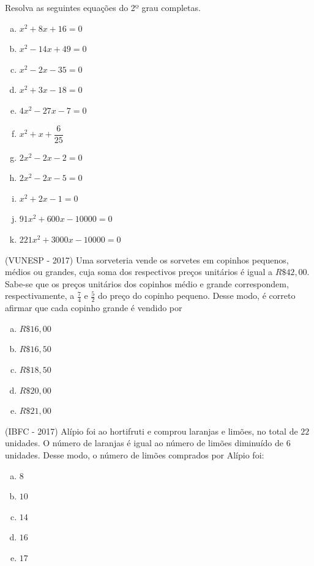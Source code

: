 \begin{exer}
Resolva as seguintes equações do 2º grau completas.
\begin{multicols}{2}
\begin{enumerate}[a)]
\item $x^2 + 8x + 16=0$
\item $x^2 - 14x + 49=0$
\item $x^2 - 2x - 35=0$
\item $x^2 + 3x - 18=0$
\item $4x^2 - 27x - 7=0$
\item $x^2 + x + \dfrac{6}{25}$
\item $2x^2 - 2x - 2=0$
\item $2x^2 - 2x - 5=0$
\item $x^2 + 2x - 1=0$
\item $91x^2 + 600x - 10000=0$
\item $221x^2 + 3000x - 10000=0$
\end{enumerate}
\end{multicols}
\end{exer}


\begin{exer}
 (VUNESP - 2017) Uma sorveteria vende os sorvetes em copinhos pequenos, médios ou grandes, cuja soma dos respectivos preços unitários é igual a $R\$ 42,00$. Sabe-se que os preços unitários dos copinhos médio e grande correspondem, respectivamente, a $\frac{7}{4}$ e $\frac{5}{2}$ do preço do copinho pequeno. Desse modo, é correto afirmar que cada copinho grande é vendido por
 \begin{multicols}{5}
 \begin{enumerate}[a)]
 \item $R\$ 16,00$
 \item $R\$ 16,50$
 \item $R\$ 18,50$
 \item $R\$ 20,00$
 \item $R\$ 21,00$
 \end{enumerate}
 \end{multicols}
 \end{exer}

 \begin{exer}
 (IBFC - 2017) Alípio foi ao hortifruti e comprou laranjas e limões, no total de $22$ unidades. O número de laranjas é igual ao número de limões diminuído de $6$ unidades. Desse modo, o número de limões comprados por Alípio foi:
 \begin{multicols}{5}
 \begin{enumerate}[a)]
 \item $8$
 \item $10$
 \item $14$
 \item $16$
 \item $17$
 \end{enumerate}
 \end{multicols}
 \end{exer}

